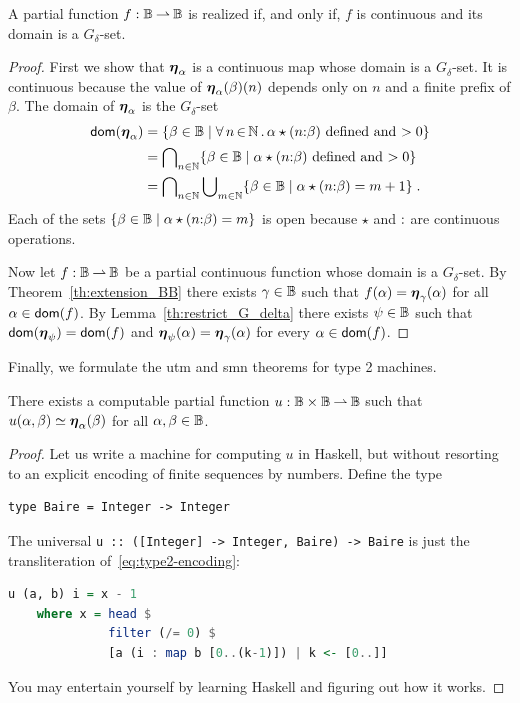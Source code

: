\begin{theorem}
  A partial function $f: \mathbb{B} \mathbin{\rightharpoonup} \mathbb{B}$ is realized if, and only
  if, $f$ is continuous and its domain is a $G_\delta$-set.
\end{theorem}

\begin{proof}
  First we show that $\text{\boldmath{$\eta$}}_\alpha$ is a continuous map whose domain
  is a $G_\delta$-set. It is continuous because the value of
  $\text{\boldmath{$\eta$}}_{\alpha}(\beta)(n)$ depends only on $n$ and a finite prefix of
  $\beta$. The domain of $\text{\boldmath{$\eta$}}_\alpha$ is the $G_\delta$-set
  \begin{align*}
    \mathsf{dom}(\text{\boldmath{$\eta$}}_\alpha)
    &= \{\beta \in \mathbb{B} \mid
      \forall\, n \,{\in}\, \mathbb{N}\,.\,
        \alpha \star (n {:} \beta) \ \text{defined and $> 0$}\} \\
    &= \bigcap\nolimits_{n \in \mathbb{N}}
      \{\beta \in \mathbb{B} \mid
        \alpha \star (n {:} \beta) \ \text{defined and $> 0$}\} \\
    &=  \bigcap\nolimits_{n \in \mathbb{N}}
        \bigcup\nolimits_{m \in \mathbb{N}}
          \{\beta \in \mathbb{B} \mid
          \alpha \star (n {:} \beta) = m + 1\} \;.
  \end{align*}
  Each of the sets $\{\beta \in \mathbb{B} \mid \alpha \star
    (n {:} \beta) = m\}$ is open because $\star$ and ${:}$
  are continuous operations.
  
  Now let $f: \mathbb{B} \mathbin{\rightharpoonup} \mathbb{B}$ be a partial continuous function
  whose domain is a $G_\delta$-set. By Theorem~\ref{th:extension_BB}
  there exists $\gamma \in \mathbb{B}$ such that $f(\alpha) =
  \text{\boldmath{$\eta$}}_{\gamma}(\alpha)$ for all $\alpha \in \mathsf{dom}(f)$. By
  Lemma~\ref{th:restrict_G_delta} there exists $\psi \in \mathbb{B}$ such
  that $\mathsf{dom}(\text{\boldmath{$\eta$}}_\psi) = \mathsf{dom}(f)$ and $\text{\boldmath{$\eta$}}_{\psi}(\alpha) =
  \text{\boldmath{$\eta$}}_{\gamma}(\alpha)$ for every $\alpha \in \mathsf{dom}(f)$.
\end{proof}

Finally, we formulate the utm and smn theorems for type 2 machines.

\begin{theorem}
  There exists a computable partial function $u : \mathbb{B} \times
  \mathbb{B} \mathbin{\rightharpoonup} \mathbb{B}$ such that $u(\alpha, \beta) \simeq
  \text{\boldmath{$\eta$}}_{\alpha}(\beta)$ for all $\alpha, \beta \in \mathbb{B}$.
\end{theorem}

\begin{proof}
  Let us write a machine for computing $u$ in Haskell, but without
  resorting to an explicit encoding of finite sequences by numbers.
  Define the type
  \begin{lstlisting}
type Baire = Integer -> Integer
  \end{lstlisting}
  The universal \lstinline!u :: ([Integer] -> Integer, Baire) -> Baire! %
  is just the transliteration of~\eqref{eq:type2-encoding}:
  \begin{lstlisting}[language=Haskell]
u (a, b) i = x - 1
    where x = head $
              filter (/= 0) $
              [a (i : map b [0..(k-1)]) | k <- [0..]]
  \end{lstlisting}
  You may entertain yourself by learning Haskell and figuring out how
  it works.
\end{proof}

